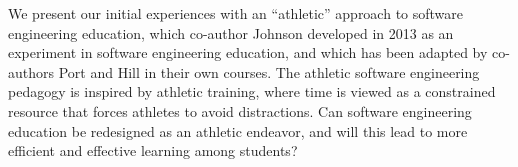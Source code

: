 We present our initial experiences with an ``athletic'' approach to software engineering education, which co-author Johnson developed in 2013 as an experiment in software engineering education, and which has been adapted by co-authors Port and Hill in their own courses. 
%
The athletic software engineering pedagogy is inspired by athletic training, where time is viewed as a constrained resource that forces athletes to avoid distractions.
Can software engineering education be redesigned as an athletic endeavor, and will this lead to more efficient and effective learning among students? 











 